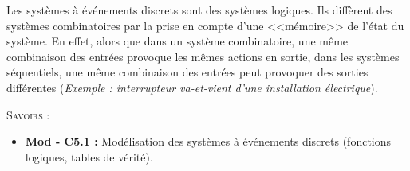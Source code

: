 \documentclass[10pt]{article}
\begin{document}


%
%
%
%
%

Les systèmes à événements discrets sont des systèmes logiques. Ils diffèrent des systèmes combinatoires par la prise en compte d'une <<mémoire>> de l'état du système. En effet, alors que dans un système combinatoire, une même combinaison des entrées provoque les mêmes actions en sortie, dans les systèmes séquentiels, une même combinaison des entrées peut provoquer des sorties différentes (\textit{Exemple : interrupteur va-et-vient d'une installation électrique}).

\begin{savoir}
\textsc{Savoirs :}
\begin{itemize}
\item \textbf{Mod - C5.1 :} Modélisation des systèmes à événements discrets (fonctions logiques, tables de vérité).
\end{itemize}
\end{savoir}
\end{document}
